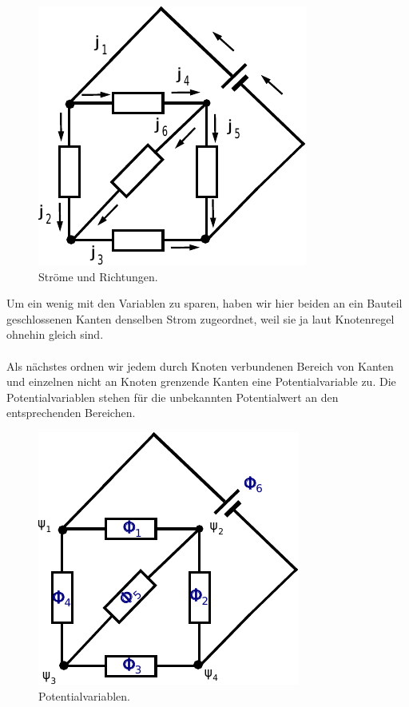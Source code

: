 \documentclass[11pt,a4paper,leqno]{report}
\numberwithin{equation}{chapter}
\begin{document}
\begin{figure}[H]
	\begin{center}
		\includegraphics[scale=0.8]{stromkreis_2.pdf}
		\caption{Str\"ome und Richtungen.}
	\end{center}
\end{figure}
\noindent
Um ein wenig mit den Variablen zu sparen, haben wir hier beiden an ein Bauteil geschlossenen Kanten denselben Strom zugeordnet, weil sie ja laut Knotenregel ohnehin gleich sind.\\
\\
Als n\"achstes ordnen wir jedem durch Knoten verbundenen Bereich von Kanten und einzelnen nicht an Knoten grenzende Kanten eine Potentialvariable zu. Die Potentialvariablen stehen f\"ur die unbekannten Potentialwert an den entsprechenden Bereichen.
\begin{figure}[H]
	\begin{center}
		\includegraphics[scale=0.8]{stromkreis_3.pdf}
		\caption{Potentialvariablen.}
	\end{center}
\end{figure}
\end{document}

